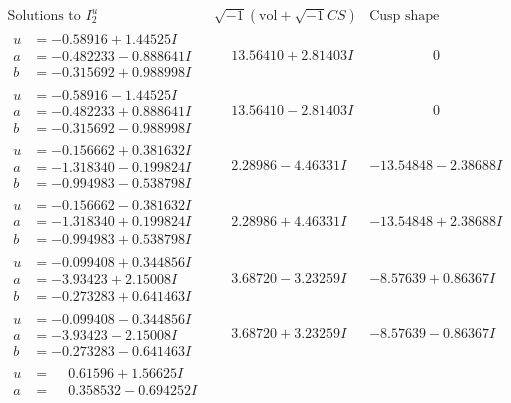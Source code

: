 \documentclass[1p]{elsarticle_modified}
\theoremstyle{definition}
\newcommand{\I}{\sqrt{-1}}
\begin{document}
$$\begin{array}{c|c|c}
\text{Solutions to }I^u_{2}& \I (\text{vol} + \sqrt{-1}CS) & \text{Cusp shape}\\
 \hline 
\begin{aligned}
u &= -0.58916 + 1.44525 I \\
a &= -0.482233 - 0.888641 I \\
b &= -0.315692 + 0.988998 I\end{aligned}
 & \phantom{-}13.56410 + 2.81403 I & \phantom{-0.000000 } 0 \\ \hline\begin{aligned}
u &= -0.58916 - 1.44525 I \\
a &= -0.482233 + 0.888641 I \\
b &= -0.315692 - 0.988998 I\end{aligned}
 & \phantom{-}13.56410 - 2.81403 I & \phantom{-0.000000 } 0 \\ \hline\begin{aligned}
u &= -0.156662 + 0.381632 I \\
a &= -1.318340 - 0.199824 I \\
b &= -0.994983 - 0.538798 I\end{aligned}
 & \phantom{-}2.28986 - 4.46331 I & -13.54848 - 2.38688 I \\ \hline\begin{aligned}
u &= -0.156662 - 0.381632 I \\
a &= -1.318340 + 0.199824 I \\
b &= -0.994983 + 0.538798 I\end{aligned}
 & \phantom{-}2.28986 + 4.46331 I & -13.54848 + 2.38688 I \\ \hline\begin{aligned}
u &= -0.099408 + 0.344856 I \\
a &= -3.93423 + 2.15008 I \\
b &= -0.273283 + 0.641463 I\end{aligned}
 & \phantom{-}3.68720 - 3.23259 I & -8.57639 + 0.86367 I \\ \hline\begin{aligned}
u &= -0.099408 - 0.344856 I \\
a &= -3.93423 - 2.15008 I \\
b &= -0.273283 - 0.641463 I\end{aligned}
 & \phantom{-}3.68720 + 3.23259 I & -8.57639 - 0.86367 I \\ \hline\begin{aligned}
u &= \phantom{-}0.61596 + 1.56625 I \\
a &= \phantom{-}0.358532 - 0.694252 I \\

\end{aligned}
\end{array}$$
\end{document}
